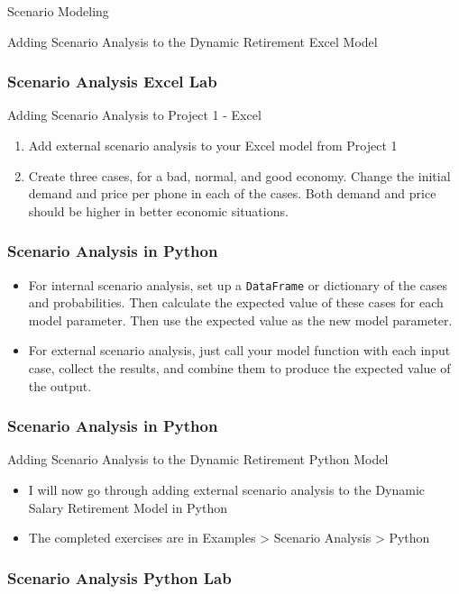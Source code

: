 \documentclass[handout, 11pt]{beamer}
\begin{document}
\begin{section}{Scenario Modeling}
\begin{frame}
{\begin{block}{Adding Scenario Analysis to the Dynamic Retirement Excel Model}
\end{block}
}
\end{frame}
\begin{frame}
\frametitle{Scenario Analysis Excel Lab}
{
\begin{block}{Adding Scenario Analysis to Project 1 - Excel}
\begin{enumerate}
\item Add external scenario analysis to your Excel model from Project 1
\item Create three cases, for a bad, normal, and good economy. Change the initial demand and price per phone in each of the cases. Both demand and price should be higher in better economic situations. 
\end{enumerate}
\vfill
\end{block}
}
\label{labs:scenario-analysis-excel-lab-1}
\end{frame}
\begin{frame}
\frametitle{Scenario Analysis in Python}
\begin{itemize}
\item For internal scenario analysis, set up a
\texttt{DataFrame}
or dictionary of the cases and probabilities. Then calculate the expected value of these cases for each model parameter. Then use the expected value as the new model parameter.
\vfill
\item For external scenario analysis, just call your model function with each input case, collect the results, and combine them to produce the expected value of the output.
\end{itemize}
\end{frame}
\begin{frame}
\frametitle{Scenario Analysis in Python}
{
\begin{block}{Adding Scenario Analysis to the Dynamic Retirement Python Model}
\begin{itemize}
\item I will now go through adding external scenario analysis to the Dynamic Salary Retirement Model in Python
\item The completed exercises are in Examples > Scenario Analysis > Python 
\end{itemize}
\end{block}
}
\end{frame}
\begin{frame}
\frametitle{Scenario Analysis Python Lab}
{
}
\end{frame}
\end{section}
\end{document}
